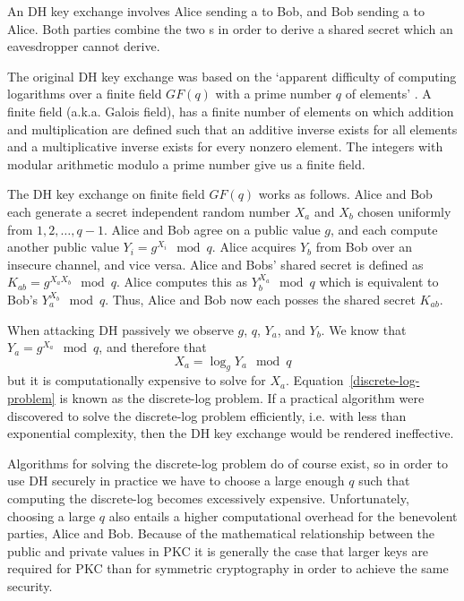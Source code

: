 An \ac{DH} key exchange involves Alice sending a  to Bob, and Bob sending a  to Alice. Both parties combine the two s in order to derive a shared secret which an eavesdropper cannot derive.

The original \ac{DH} key exchange was based on the
`apparent difficulty of computing logarithms over a finite field $GF(q)$ with a prime number $q$ of elements' \cite[p. 8]{diffie-hellman-1976}.
A finite field (a.k.a. Galois field), has a finite number of elements on which addition and multiplication are defined such that an additive inverse exists for all
elements and a multiplicative inverse exists for every nonzero element.
The integers with modular arithmetic modulo a prime number give us a finite field.

The \ac{DH} key exchange on finite field $GF(q)$ works as follows.
Alice and Bob each generate a secret independent random number $X_a$ and $X_b$ chosen uniformly from ${1,2,\dots,q-1}$.
Alice and Bob agree on a public value $g$, and each compute another public value $Y_i=g^{X_i}\mod q$.
Alice acquires $Y_b$ from Bob over an insecure channel, and vice versa.
Alice and Bobs' shared secret is defined as $K_{ab}=g^{X_aX_b}\mod q$.
Alice computes this as $Y_b^{X_a}\mod q$ which is equivalent to Bob's $Y_a^{X_b}\mod q$.
Thus, Alice and Bob now each posses the shared secret $K_{ab}$.

When attacking \ac{DH} passively we observe $g$, $q$, $Y_a$, and $Y_b$.
We know that $Y_a=g^{X_a}\mod q$, and therefore that
\begin{equation}
\label{discrete-log-problem}
X_a=\log_g Y_a \mod q
\end{equation}
but it is computationally expensive to solve for $X_a$.
Equation~\ref{discrete-log-problem} is known as the discrete-log problem.
If a practical algorithm were discovered to solve the discrete-log problem efficiently,
i.e. with less than exponential complexity, then the \ac{DH} key exchange would be rendered ineffective.

Algorithms for solving the discrete-log problem do of course exist, so in order to use \ac{DH} securely in practice we have to choose a large enough $q$ such that computing the discrete-log becomes excessively expensive.
Unfortunately, choosing a large $q$ also entails a higher computational overhead for the benevolent parties, Alice and Bob.
Because of the mathematical relationship between the public and private values in \ac{PKC} it is generally the case that larger keys are required for \ac{PKC} than for symmetric cryptography in order to achieve the same security.

